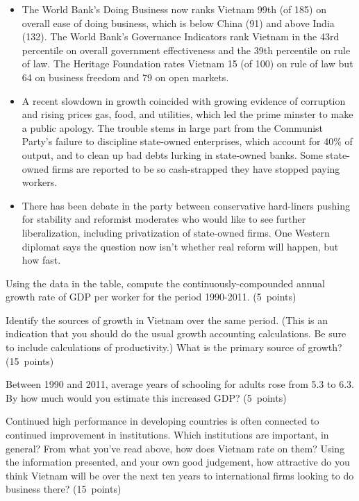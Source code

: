 \documentclass[letterpaper,12pt]{exam}
\begin{document}
\begin{questions}
\begin{itemize}
\item
The World Bank's Doing Business now ranks Vietnam 99th (of 185) on overall ease of doing business, which is below China (91) and above India (132).
The World Bank's Governance Indicators rank Vietnam in the 43rd percentile
on overall government effectiveness and the 39th percentile on rule of law.
The Heritage Foundation rates Vietnam 15 (of 100) on rule of law
but 64 on business freedom and 79 on open markets.

\item A recent slowdown in growth coincided
with growing evidence of corruption
and rising prices gas, food, and utilities,
which led the prime minster to make a public apology.
The trouble stems in large part from the Communist Party's
failure to discipline state-owned enterprises,
which account for 40\% of output, and to clean up bad debts lurking in state-owned banks.
Some state-owned firms are reported to be so cash-strapped
they have stopped paying workers.

\item There has been debate in the party
between conservative hard-liners pushing for stability
and reformist moderates who would like to see further liberalization,
including privatization of state-owned firms.
One Western diplomat says the question now isn't whether
real reform will happen, but how fast.
\end{itemize}
%
\begin{parts}
\item Using the data in the table,
compute the continuously-compounded annual growth rate of GDP per worker
for the period 1990-2011.
(5~points)

\item Identify the sources of growth in Vietnam over the same period.
(This is an indication that you should do the usual growth accounting calculations.
Be sure to include calculations of productivity.)
What is the primary source of growth?
(15~points)

\item Between 1990 and 2011, average years of schooling for adults
rose from 5.3 to 6.3.
By how much would you estimate this increased GDP?
(5~points)

\item Continued high performance in developing countries is often
connected to continued improvement in institutions.
Which institutions are important, in general?
From what you've read above, how does Vietnam rate on them?
Using the information presented, and your own good judgement,
how attractive do you think Vietnam will be over the next ten years
to international firms looking to do business there?
(15~points)
\end{parts}


\end{questions}
\end{document}
